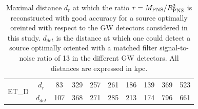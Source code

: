 \begin{table}
\begin{tabular}{c|c|cccccccc}
\hline
\multirow{2}{*}{ET\_D} & $d_{r}$ & 83  & 329 & 257 & 261 & 186 & 139 & 369 & 523 \\
\cline{2-10}
                       & $d_{det}$ & 107 & 368 & 271 & 285 & 213 & 174 & 796  & 661\\

  \end{tabular}
  \caption{%
    Maximal distance $d_{r}$ at which the ratio $r=M_{\rm PNS}/R_{\rm PNS}^2$ is reconstructed
    with good accuracy for a source optimally oreinted with respect to the GW detectors
    considered in this study. $d_{det}$ is the distance at which one could detect a source
    optimally oriented with a matched filter signal-to-noise ratio of 13 in the  different
    GW detectors. All distances are expressed in kpc.
  }
  \label{tab:results}
\end{table}

